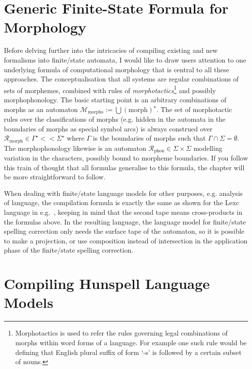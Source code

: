 \documentclass[officiallayout]{unihelcompling}
\begin{document}
\section{Generic Finite-State Formula for Morphology}
\label{sec:generic}

Before delving further into the intricacies of compiling existing and new
formalisms into finite\-/state automata, I would like to draw users attention
to one underlying formula of computational morphology that is central to all
these approaches. The conceptualisation that all systems are regular
combinations of sets of morphemes, combined with rules of
\emph{morphotactics}\footnote{Morphotactics is used to refer the rules
    governing legal combinations of morphs within word forms of a language. For
example one such rule would be defining that English plural suffix of form `-s'
is followed by a certain subset of nouns.} and possibly morphophonology.  The
basic starting point is an arbitrary combinations of morphs as an automaton
$\mathcal{M}_{\mathrm{morphs}} := \bigcup ({\mathrm{morph}})^\star$. The set of
morphotactic rules over the classifications of morphs (e.g. hidden in the
automata in the boundaries of morphs as special symbol arcs) is always
construed over $\mathcal{R}_{\mathrm{morph}} \in \Gamma^\star << \Sigma^\star$
where $\Gamma$ is the boundaries of morphs such that $\Gamma \cap \Sigma =
\emptyset$. The morphophonology likewise is an automaton
$\mathcal{R}_{\mathrm{phon}} \in \Sigma \times \Sigma$ modelling variation in
the characters, possibly bound to morpheme boundaries. If you follow this train
of thought that all formulas generalise to this formula, the chapter will be
more straightforward to follow.

When dealing with finite\-/state language models for other purposes, e.g.
analysis of language, the compilation formula is exactly the same as shown for
the Lexc language in e.g.~\citet{linden2009hfst}, keeping in mind that the
second tape means cross-products in the formulas above. In the resulting
language, the language model for finite\-/state spelling correction only needs
the surface tape of the automaton, so it is possible to make a projection, or
use composition instead of intersection in the application phase of the
finite\-/state spelling correction.

\section{Compiling Hunspell Language Models}
\label{sec:Hunspell}
\end{document}

